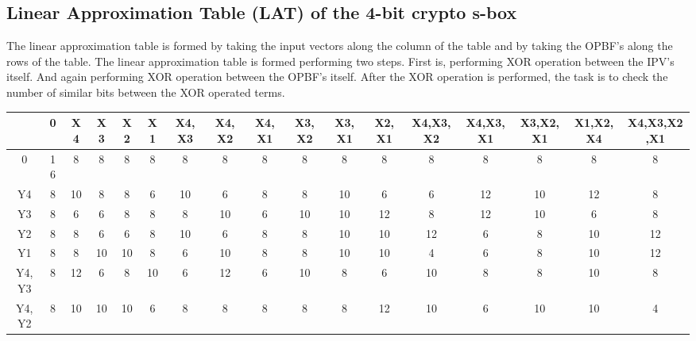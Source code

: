 \documentclass[12pt]{article}
\begin{document}
\subsection{Linear Approximation Table (LAT) of the 4-bit crypto s-box}
The linear approximation table is formed by taking the input vectors along the column of the table and by taking the OPBF’s along the rows of the table. The linear approximation table is formed performing two steps. First is, performing XOR operation between the IPV’s itself. And again performing XOR operation between the OPBF’s itself. After the XOR operation is performed, the task is to check the number of similar bits between the XOR operated terms.  
\begin{table}[H]
    \centering
    \begin{adjustbox}{width=\textwidth}
    \begin{tabular}{|c|c|c|c|c|c|c|c|c|c|c|c|c|c|c|c|c|}
        \hline
                    & 0  & X4 & X3 & X2 & X1 & X4,X3 & X4,X2 & X4,X1 & X3,X2 & X3,X1 & X2,X1 & X4,X3,X2 & X4,X3,X1 & X3,X2,X1 & X1,X2,X4 & X4,X3,X2,X1 \\
        \hline
        0           & 16 & 8  & 8  & 8  & 8  & 8     & 8     & 8     & 8     & 8     & 8     & 8        & 8        & 8        & 8        & 8           \\
        \hline
        Y4          & 8  & 10 & 8  & 8  & 6  & 10    & 6     & 8     & 8     & 10    & 6     & 6        & 12       & 10       & 12       & 8           \\
        \hline
        Y3          & 8  & 6  & 6  & 8  & 8  & 8     & 10    & 6     & 10    & 10    & 12    & 8        & 12       & 10       & 6        & 8           \\
        \hline
        Y2          & 8  & 8  & 6  & 6  & 8  & 10    & 6     & 8     & 8     & 10    & 10    & 12       & 6        & 8        & 10       & 12          \\
        \hline
        Y1          & 8  & 8  & 10 & 10 & 8  & 6     & 10    & 8     & 8     & 10    & 10    & 4        & 6        & 8        & 10       & 12          \\
        \hline
        Y4,Y3       & 8  & 12 & 6  & 8  & 10 & 6     & 12    & 6     & 10    & 8     & 6     & 10       & 8        & 8        & 10       & 8           \\
        \hline
        Y4,Y2       & 8  & 10 & 10 & 10 & 6  & 8     & 8     & 8     & 8     & 8     & 12    & 10       & 6        & 10       & 10       & 4           \\

\end{tabular}
\end{adjustbox}
\end{table}
\end{document}
